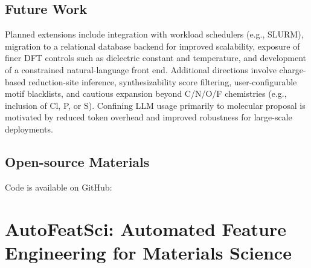 
\subsection*{Future Work}
Planned extensions include integration with workload schedulers (e.g., SLURM), migration to a relational database backend for improved scalability, exposure of finer DFT controls such as dielectric constant and temperature, and development of a constrained natural-language front end. Additional directions involve charge-based reduction-site inference, synthesizability score filtering, user-configurable motif blacklists, and cautious expansion beyond C/N/O/F chemistries (e.g., inclusion of Cl, P, or S). Confining LLM usage primarily to molecular proposal is motivated by reduced token overhead and improved robustness for large-scale deployments.

\subsection*{Open-source Materials}
Code is available on GitHub:  \cite{RedoxFlow_Zenodo_2025}








\section{AutoFeatSci: Automated Feature Engineering for Materials Science}

